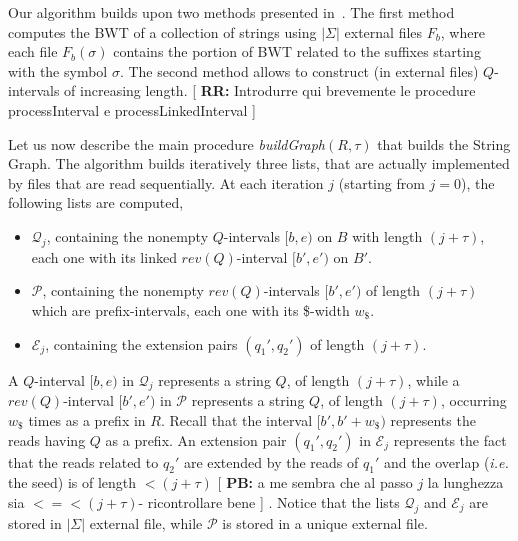 \documentclass[runningheads,envcountsame,a4paper]{llncs}
\newcommand{\notaestesa}[2]{%
 \marginpar{\color{red!75!black}\textbf{\texttimes}}%
 {\color{red!75!black}%
 [\,\textbullet\,\textsf{\textbf{#1:}} %
 \textsf{\footnotesize#2}\,\textbullet\,]}%
}
\newcommand{\ie}{\textit{i.e.}\xspace}
\begin{document}
Our algorithm builds upon two methods presented in~\cite{Bauer2011,Cox2012}.
The first method computes the BWT of a collection of strings using $|\Sigma|$
external files $F_b$, where each file $F_b(\sigma)$ contains the portion of BWT related to the suffixes
starting with the symbol $\sigma$.
The second method allows to construct (in external files) $Q$-intervals
of increasing length. \notaestesa{RR}{Introdurre qui brevemente le procedure processInterval e processLinkedInterval}

\begin{comment}
In particular, the procedure \emph{processInterval} given
in~\cite{Cox2012} is used in our algorithm to produce the sorted list
(lexicographical order) of the intervals of a given length $l$, from the
sorted list of the intervals of length $l-1$ (intervals of length $1$
can be easily obtained by means of the FM-index function $C$).
\notaestesa{Raffa}{Togliere lo pseudocodice della procedura processInterval: \'e della Rosone e non nostro.}.
\notaestesa{GDV}{ Concordo di togliere lo pseudocodice.
Bisogna dire però cosa calcola la procedura}

We extend the procedure \emph{processInterval} to
\emph{processLinkedInterval}, where we produce not only the $Q$-intervals on $B$, but also the linked
$rev(Q)$-intervals on $B'$.
\end{comment}



Let us now describe the main procedure \emph{buildGraph$(R, \tau)$} that
builds the String Graph.
The algorithm builds iteratively three lists,
that are actually implemented by files that are read sequentially.
At each iteration $j$ (starting from $j=0$), the following lists are computed,
\begin{itemize}
\item $\mathcal{Q}_j$, containing the nonempty $Q$-intervals $[b, e)$ on $B$ with length $(j+\tau)$,
each one with its linked
  $rev(Q)$-interval $[b', e')$ on $B'$.
\item $\mathcal{P}$, containing the nonempty $rev(Q)$-intervals $[b', e')$ of
  length $(j+\tau)$ which are prefix-intervals, each one with its \$-width $w_{\$}$.
\item $\mathcal{E}_j$, containing the extension pairs $(q_{1}', q_{2}')$ of
  length $(j+\tau)$. %
\end{itemize}

A $Q$-interval  $[b,e)$ in $\mathcal{Q}_j$ represents a
string $Q$, of length $(j+\tau)$, while
a $rev(Q)$-interval  $[b',e')$ in $\mathcal{P}$ represents a
string $Q$, of length $(j+\tau)$, occurring $w_\$$ times as a prefix in $R$.
Recall that the interval $[b',b'+w_\$)$ represents the reads having $Q$ as
a prefix. An extension pair $(q_{1}', q_{2}')$ in $\mathcal{E}_j$ represents the fact that the reads related to $q_{2}'$ are extended by the reads of $q_{1}'$ and the overlap (\ie the seed) is of length $<(j+\tau)$ \notaestesa{PB}{a me sembra che al passo $j$ la lunghezza sia $< =< (j+\tau)$- ricontrollare bene}.
Notice that the lists $\mathcal{Q}_j$ and  $\mathcal{E}_j$ are stored in $|\Sigma|$ external file, while $\mathcal{P}$ is stored in a unique external file.
\end{document}
